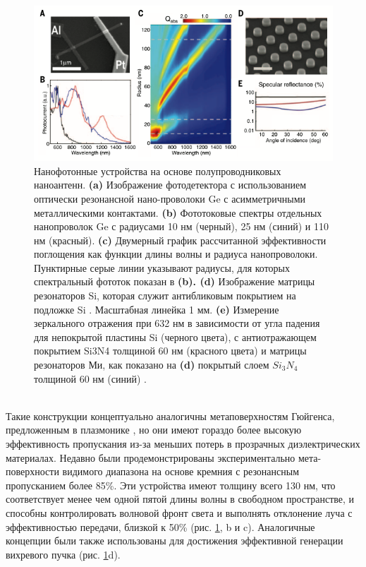  \begin{figure}[h!]
	\centering
	\includegraphics[width=0.8\linewidth]{images/fig5.png}
	\caption{ Нанофотонные устройства на основе полупроводниковых наноантенн. \textbf{(a)} Изображение фотодетектора с использованием оптически резонансной нано-проволоки Ge с асимметричными металлическими контактами. \textbf{(b)} Фототоковые спектры отдельных нанопроволок Ge с радиусами 10 нм (черный), 25 нм (синий) и 110 нм (красный). \textbf{(c)} Двумерный график рассчитанной эффективности поглощения как функции длины волны и радиуса нанопроволоки. Пунктирные серые линии указывают радиусы, для которых спектральный фототок показан в \textbf{(b). (d)} Изображение матрицы резонаторов Si, которая служит антибликовым покрытием на подложке Si \cite{spinelli2012broadband}. Масштабная линейка 1 мм. \textbf{(e)} Измерение зеркального отражения при 632 нм в зависимости от угла падения для непокрытой пластины Si (черного цвета), с антиотражающем покрытием Si3N4 толщиной 60 нм (красного цвета) и матрицы резонаторов Ми, как показано на \textbf{(d)} покрытый слоем $Si_3N_4$ толщиной 60 нм (синий) \cite{spinelli2012broadband}. }
	\label{nonliner:matasurf1}
\end{figure}
\\
\hspace*{2mm}
Такие конструкции концептуально аналогичны метаповерхностям Гюйгенса, предложенным в плазмонике \cite{pfeiffer2014efficient}, но они имеют гораздо более высокую эффективность пропускания из-за меньших потерь в прозрачных диэлектрических материалах. Недавно были продемонстрированы экспериментально мета-поверхности видимого диапазона на основе кремния с резонансным пропусканием более 85\%. Эти устройства имеют толщину всего 130 нм, что соответствует менее чем одной пятой длины волны в свободном пространстве, и способны контролировать волновой фронт света и выполнять отклонение луча с эффективностью передачи, близкой к 50\% (рис. \ref{nonliner:matasurf1}, b и c). Аналогичные концепции были также использованы для достижения эффективной генерации вихревого пучка (рис. \ref{nonliner:matasurf1}d). 
